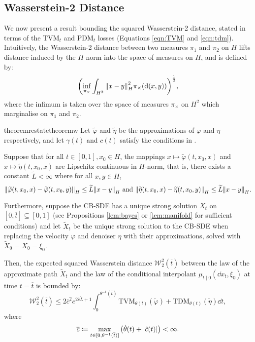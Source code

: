 \subsection{Wasserstein-2 Distance}
We now present a result bounding the squared Wasserstein-2 distance, stated in terms of the \(\mathrm{TVM}_{t}\) and \(\mathrm{PDM}_{t}\) losses (Equations \ref{eqn:TVM} and \ref{eqn:tdm}). Intuitively, the Wasserstein-2 distance between two measures \(\pi_{1}\) and \(\pi_{2}\) on \(H\) lifts distance induced by the \(H\)-norm into the space of measures on \(H\), and is defined by:
\[
  \qty(\inf_{\pi_{\times}} \int_{H^{2}} \norm{x - y}^{2}_{H} \pi_{\times}(\dd{(x, y)}))^{\frac{1}{2}},
\]
where the infimum is taken over the space of measures \(\pi_{\times}\) on \(H^{2}\) which marginalise on \(\pi_{1}\) and \(\pi_{2}\).
\begin{theorembox}
  \begin{restatable}{theorem}{restatetheoremw}\label{thm:w2}
    Let \(\widetilde{\varphi}\) and \(\widetilde{\eta}\) be the approximations of \(\varphi\) and \(\eta\) respectively, and let \(\gamma(t)\) and \(c(t)\) satisfy the conditions in .

    Suppose that for all \(t \in [0, 1], x_{0} \in H\), the mappings \(x \mapsto \widetilde{\varphi}(t, x_{0}, x)\) and \(x \mapsto \widetilde{\eta}(t, x_{0}, x)\) are Lipschitz continuous in \(H\)-norm, that is, there exists a constant \(\widetilde{L} < \infty\) where for all \(x, y \in H\),
    \[
      \norm{\widetilde{\varphi}(t, x_{0}, x) - \widetilde{\varphi}(t, x_{0}, y)}_{H} \leq \widetilde{L} \norm{x - y}_{H} \text{ and } \norm{\widetilde{\eta}(t, x_{0}, x) - \widetilde{\eta}(t, x_{0}, y)}_{H} \leq \widetilde{L} \norm{x - y}_{H}.
    \]

    Furthermore, suppose the CB-SDE has a unique strong solution \(X_{t}\) on \([0, \overline{t}] \subseteq [0, 1]\) (see Propositions \ref{lem:bayes} or \ref{lem:manifold} for sufficient conditions) and let \(\widetilde{X}_{t}\) be the unique strong solution to the CB-SDE when replacing the velocity \(\varphi\) and denoiser \(\eta\) with their approximations, solved with \(\widetilde{X}_{0} = X_{0} = \xi_{0}\).

    Then, the expected squared Wasserstein distance \(\mathcal{W}_{2}^{2}(\overline{t})\) between the law of the approximate path \(\widetilde{X}_{t}\) and the law of the conditional interpolant \(\mu_{t \mid 0}(\dd{x_{t}}, \xi_{0})\) at time \(t = \overline{t}\) is bounded by:
    \begin{equation}
      \mathcal{W}_{2}^{2}(\overline{t}) \leq 2\overline{c}^{2} e^{2 \overline{c} \widetilde{L} + 1} \int_{0}^{\theta^{-1}(\overline{t})} \mathrm{TVM}_{\theta(t)}(\widetilde{\varphi}) + \mathrm{TDM}_{\theta(t)}(\widetilde{\eta})\dd{t}, \label{eqn:w2}
    \end{equation}
    where
    \[
      \overline{c} \coloneqq \mathop{\underset{t \in [0, \theta^{-1}(\overline{t})]}{\max}} \qty(\dot{\theta}(t) + \abs{\hat{c}(t)}) < \infty.
    \]
  \end{restatable}
\end{theorembox}
